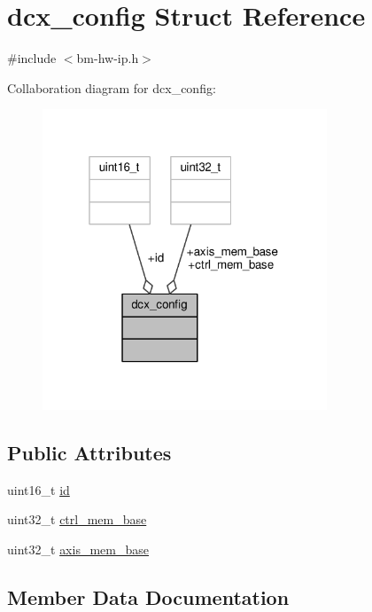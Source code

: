 \hypertarget{structdcx__config}{}\section{dcx\+\_\+config Struct Reference}
\label{structdcx__config}


{\ttfamily \#include $<$bm-\/hw-\/ip.\+h$>$}



Collaboration diagram for dcx\+\_\+config\+:
\nopagebreak
\begin{figure}[H]
\begin{center}
\leavevmode
\includegraphics[width=241pt]{structdcx__config__coll__graph}
\end{center}
\end{figure}
\subsection*{Public Attributes}
\begin{DoxyCompactItemize}
\item 
uint16\+\_\+t \hyperlink{structdcx__config_a70e359a93971135101d7035d39eeca17}{id}
\item 
uint32\+\_\+t \hyperlink{structdcx__config_a75f8a6e408ba2b7a6f68c2171c2107d4}{ctrl\+\_\+mem\+\_\+base}
\item 
uint32\+\_\+t \hyperlink{structdcx__config_a9297308ad57eee72697c41660ccb2b86}{axis\+\_\+mem\+\_\+base}
\end{DoxyCompactItemize}


\subsection{Member Data Documentation}
